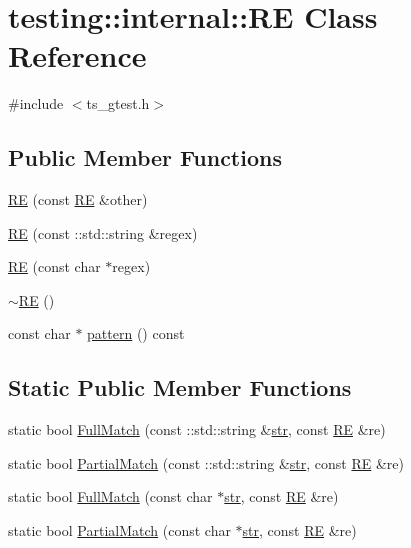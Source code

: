 \hypertarget{classtesting_1_1internal_1_1RE}{\section{testing\-:\-:internal\-:\-:R\-E Class Reference}
\label{classtesting_1_1internal_1_1RE}
}


{\ttfamily \#include $<$ts\-\_\-gtest.\-h$>$}

\subsection*{Public Member Functions}
\begin{DoxyCompactItemize}
\item 
\hyperlink{classtesting_1_1internal_1_1RE_ab215dbc2565fce641e1746ca43e9d68a}{R\-E} (const \hyperlink{classtesting_1_1internal_1_1RE}{R\-E} \&other)
\item 
\hyperlink{classtesting_1_1internal_1_1RE_a8840bd639642f3d4769a94a68ce463c2}{R\-E} (const \-::std\-::string \&regex)
\item 
\hyperlink{classtesting_1_1internal_1_1RE_a908ea936a5b7a14479a1b292a7189ca6}{R\-E} (const char $\ast$regex)
\item 
\hyperlink{classtesting_1_1internal_1_1RE_af3ad18e6c0b433f3d85ed23eda8119f3}{$\sim$\-R\-E} ()
\item 
const char $\ast$ \hyperlink{classtesting_1_1internal_1_1RE_acb67d77f53e73af81cce6dcd663c94df}{pattern} () const 
\end{DoxyCompactItemize}
\subsection*{Static Public Member Functions}
\begin{DoxyCompactItemize}
\item 
static bool \hyperlink{classtesting_1_1internal_1_1RE_aa79a950758d0f1d62f7762d1e9cefe86}{Full\-Match} (const \-::std\-::string \&\hyperlink{core__c_8h_a5f3a65d240411b0018990ff992b348c0}{str}, const \hyperlink{classtesting_1_1internal_1_1RE}{R\-E} \&re)
\item 
static bool \hyperlink{classtesting_1_1internal_1_1RE_a1e81f9a87211bdca645e025f8f0236c8}{Partial\-Match} (const \-::std\-::string \&\hyperlink{core__c_8h_a5f3a65d240411b0018990ff992b348c0}{str}, const \hyperlink{classtesting_1_1internal_1_1RE}{R\-E} \&re)
\item 
static bool \hyperlink{classtesting_1_1internal_1_1RE_a2b13ec1f6ccd6c32f7efa01e21588f0b}{Full\-Match} (const char $\ast$\hyperlink{core__c_8h_a5f3a65d240411b0018990ff992b348c0}{str}, const \hyperlink{classtesting_1_1internal_1_1RE}{R\-E} \&re)
\item 
static bool \hyperlink{classtesting_1_1internal_1_1RE_a97495dd4c2bb9589522823f060c8e8ba}{Partial\-Match} (const char $\ast$\hyperlink{core__c_8h_a5f3a65d240411b0018990ff992b348c0}{str}, const \hyperlink{classtesting_1_1internal_1_1RE}{R\-E} \&re)
\end{DoxyCompactItemize}


